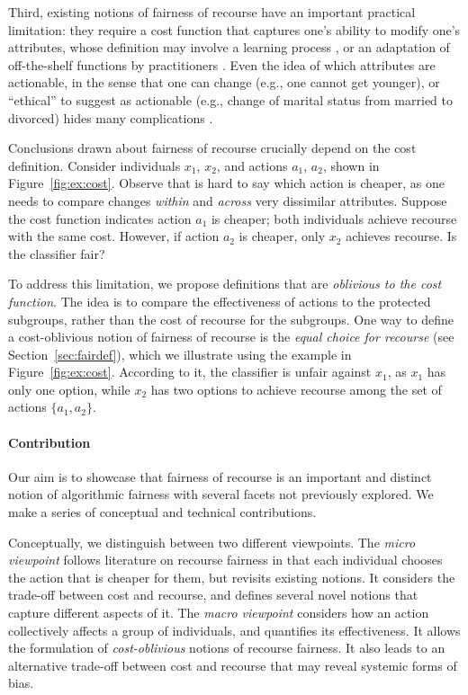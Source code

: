 \documentclass{article}
\begin{document}
Third, existing notions of fairness of recourse have an important practical limitation: they require a cost function that captures one's ability to modify one's attributes, whose definition may involve a learning process \cite{rawal2020beyond}, or an adaptation of off-the-shelf functions by practitioners \cite{ustun2019actionable}. Even the idea of which attributes are actionable, in the sense that one can change (e.g., one cannot get younger), or ``ethical'' to suggest as actionable (e.g., change of marital status from married to divorced) hides many complications \cite{venkatasubramanian2020philosophical}. 



Conclusions drawn about fairness of recourse crucially depend on the cost definition. Consider individuals $x_1$, $x_2$, and actions $a_1$, $a_2$, shown in Figure~\ref{fig:ex:cost}. Observe that is hard to say which action is cheaper, as one needs to compare changes \emph{within} and \emph{across} very dissimilar attributes.
Suppose the cost function indicates action $a_1$ is cheaper; both individuals achieve recourse with the same cost. However, if action $a_2$ is cheaper, only $x_2$ achieves recourse. Is the classifier fair?

To address this limitation, we propose definitions that are \emph{oblivious to the cost function}. The idea is to compare the effectiveness of actions to the protected subgroups, rather than the cost of recourse for the subgroups. One way to define a cost-oblivious notion of fairness of recourse is the \emph{equal choice for recourse} (see Section~\ref{sec:fairdef}), which we illustrate using the example in Figure~\ref{fig:ex:cost}. According to it, the classifier is unfair against $x_1$, as $x_1$ has only one option, while $x_2$ has two options to achieve recourse among the set of actions $\{a_1, a_2\}$.




\paragraph{Contribution}
%
Our aim is to showcase that fairness of recourse is an important and distinct notion of algorithmic fairness with several facets not previously explored. We make a series of conceptual and technical contributions.

Conceptually, we distinguish between two different viewpoints. 
The \emph{micro viewpoint} follows literature on recourse fairness \cite{gupta2019equalizing,karimi2022survey,KugelgenKBVWS22,kuratomi2023measuring} in that each individual chooses the action that is cheaper for them, but revisits existing notions. It considers the trade-off between cost and recourse, and defines several novel notions that capture different aspects of it.
The \emph{macro viewpoint} considers how an action collectively affects a group of individuals, and quantifies its effectiveness. It allows the formulation of \emph{cost-oblivious} notions of recourse fairness. It also leads to an alternative trade-off between cost and recourse that may reveal systemic forms of bias.
\end{document}
